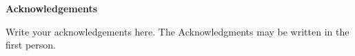 
\begin{center}

\textbf{\large Acknowledgements}
\end{center}


\begin{flushleft}
\hspace{10mm} Write your acknowledgements here. The Acknowledgments may be written in the first person.
\end{flushleft}



